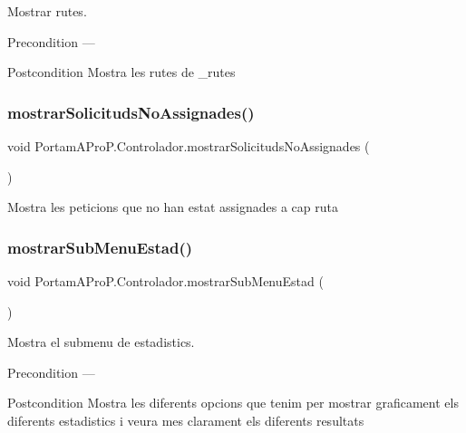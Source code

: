 Mostrar rutes. 

\begin{DoxyPrecond}{Precondition}
--- 
\end{DoxyPrecond}
\begin{DoxyPostcond}{Postcondition}
Mostra les rutes de \+\_\+rutes 
\end{DoxyPostcond}
\mbox{\label{class_portam_a_pro_p_1_1_controlador_a0142050a4eea8d58f003ef8ac92c6f19}} 
\subsubsection{\texorpdfstring{mostrar\+Solicituds\+No\+Assignades()}{mostrarSolicitudsNoAssignades()}}
{\footnotesize\ttfamily void Portam\+A\+Pro\+P.\+Controlador.\+mostrar\+Solicituds\+No\+Assignades (\begin{DoxyParamCaption}{ }\end{DoxyParamCaption})}

Mostra les peticions que no han estat assignades a cap ruta \mbox{\label{class_portam_a_pro_p_1_1_controlador_aa0e7fc666e46a4ddf1856834f9e91689}} 
\subsubsection{\texorpdfstring{mostrar\+Sub\+Menu\+Estad()}{mostrarSubMenuEstad()}}
{\footnotesize\ttfamily void Portam\+A\+Pro\+P.\+Controlador.\+mostrar\+Sub\+Menu\+Estad (\begin{DoxyParamCaption}{ }\end{DoxyParamCaption})}



Mostra el submenu de estadistics. 

\begin{DoxyPrecond}{Precondition}
--- 
\end{DoxyPrecond}
\begin{DoxyPostcond}{Postcondition}
Mostra les diferents opcions que tenim per mostrar graficament els diferents estadistics i veura mes clarament els diferents resultats 
\end{DoxyPostcond}
\mbox{\label{class_portam_a_pro_p_1_1_controlador_afa9baa308b66d786e6a7dde83d0e6898}} 
